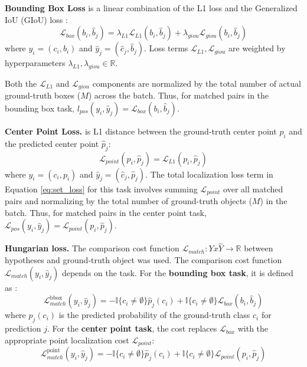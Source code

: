 \textbf{Bounding Box Loss} is a linear combination of the L1 loss and the Generalized IoU (GIoU) loss \cite{rezatofighiGeneralizedIntersectionUnion2019}:
\begin{equation}
    \mathcal{L}_{box}(b_i, \hat{b}_j) = \lambda_{L1} \mathcal{L}_{L1}(b_i, \hat{b}_j) + \lambda_{giou} \mathcal{L}_{giou}(b_i, \hat{b}_j)
    \label{eq:box_loss_revised}
\end{equation}
where $y_i = (c_i, b_i)$ and $\hat{y}_j = (\hat{c}_j, \hat{b}_j)$. Loss terms $ \mathcal{L}_{L1}, \mathcal{L}_{giou} $ are weighted by hyperparameters $ \lambda_{L1}, \lambda_{giou} \in \mathbb{R} $.

Both the $ \mathcal{L}_{L1} $ and $ \mathcal{L}_{giou} $ components are normalized by the total number of actual ground-truth boxes ($M$) across the batch. Thus, for matched pairs in the bounding box task, $l_{pos}(y_i, \hat{y}_j) = \mathcal{L}_{box}(b_i, \hat{b}_j)$.

\textbf{Center Point Loss.} is L1 distance between the ground-truth center point $p_i$ and the predicted center point $\hat{p}_j$:
\begin{equation} \label{eq:point_loss}
    \mathcal{L}_{point}(p_i, \hat{p}_j) = \mathcal{L}_{L1}(p_i, \hat{p}_j)
\end{equation}
where $y_i = (c_i, p_i)$ and $\hat{y}_j = (\hat{c}_j, \hat{p}_j)$. The total localization loss term in Equation \ref{eq:set_loss} for this task involves summing $\mathcal{L}_{point}$ over all matched pairs and normalizing by the total number of ground-truth objects ($M$) in the batch. Thus, for matched pairs in the center point task, $\mathcal{L}_{pos}(y_i, \hat{y}_j) = \mathcal{L}_{point}(p_i, \hat{p}_j)$.

\textbf{Hungarian loss.} The comparison cost function $\mathcal{L}_{match}: Y x \hat{Y} \rightarrow \mathbb{R}$ between hypotheses and ground-truth object was used. The comparison cost function $\mathcal{L}_{match}(y_i, \hat{y}_j)$ depends on the task. For the \textbf{bounding box task}, it is defined as \cite{carionEndtoEndObjectDetection2020}:
\begin{equation} \label{eq:matching_cost_bbox}
\mathcal{L}_{match}^{\text{bbox}}(y_i, \hat{y}_j) = - \mathbb{I}\{c_i \neq \emptyset\} \hat{p}_{j}(c_i) + \mathbb{I}\{c_i \neq \emptyset\} \mathcal{L}_{box}(b_i, \hat{b}_{j})
\end{equation}
where $\hat{p}_j(c_i)$ is the predicted probability of the ground-truth class $c_i$ for prediction $j$. For the \textbf{center point task}, the cost replaces $\mathcal{L}_{box}$ with the appropriate point localization cost $\mathcal{L}_{point}$:
\begin{equation} \label{eq:matching_cost_point}
\mathcal{L}_{match}^{\text{point}}(y_i, \hat{y}_j) = - \mathbb{I}\{c_i \neq \emptyset\} \hat{p}_{j}(c_i) + \mathbb{I}\{c_i \neq \emptyset\} \mathcal{L}_{point}(p_i, \hat{p}_{j})
\end{equation}

